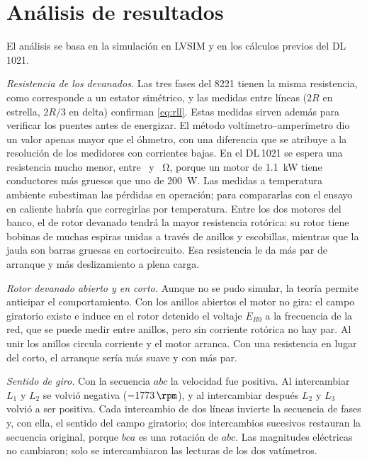 \documentclass[conference]{IEEEtran}
\begin{document}
\section{Análisis de resultados}
El análisis se basa en la simulación en LVSIM y en los cálculos previos del DL\,1021.

\emph{Resistencia de los devanados.} Las tres fases del 8221 tienen la misma resistencia, como corresponde a un estator simétrico, y las medidas entre líneas ($2R$ en estrella, $2R/3$ en delta) confirman \eqref{eq:rll}. Estas medidas sirven además para verificar los puentes antes de energizar. El método voltímetro--amperímetro dio un valor apenas mayor que el óhmetro, con una diferencia que se atribuye a la resolución de los medidores con corrientes bajas. En el DL\,1021 se espera una resistencia mucho menor, entre \DLRLo\ y \DLRHi~\si{\ohm}, porque un motor de \SI{1,1}{kW} tiene conductores más gruesos que uno de \SI{200}{W}. Las medidas a temperatura ambiente subestiman las pérdidas en operación; para compararlas con el ensayo en caliente habría que corregirlas por temperatura. Entre los dos motores del banco, el de rotor devanado tendrá la mayor resistencia rotórica: su rotor tiene bobinas de muchas espiras unidas a través de anillos y escobillas, mientras que la jaula son barras gruesas en cortocircuito. Esa resistencia le da más par de arranque y más deslizamiento a plena carga.

\emph{Rotor devanado abierto y en corto.} Aunque no se pudo simular, la teoría permite anticipar el comportamiento. Con los anillos abiertos el motor no gira: el campo giratorio existe e induce en el rotor detenido el voltaje $E_{R0}$ a la frecuencia de la red, que se puede medir entre anillos, pero sin corriente rotórica no hay par. Al unir los anillos circula corriente y el motor arranca. Con una resistencia en lugar del corto, el arranque sería más suave y con más par.

\emph{Sentido de giro.} Con la secuencia $abc$ la velocidad fue positiva. Al intercambiar $L_1$ y $L_2$ se volvió negativa ($\SI{-1773}{\rpm}$), y al intercambiar después $L_2$ y $L_3$ volvió a ser positiva. Cada intercambio de dos líneas invierte la secuencia de fases y, con ella, el sentido del campo giratorio; dos intercambios sucesivos restauran la secuencia original, porque $bca$ es una rotación de $abc$. Las magnitudes eléctricas no cambiaron; solo se intercambiaron las lecturas de los dos vatímetros.
\end{document}
